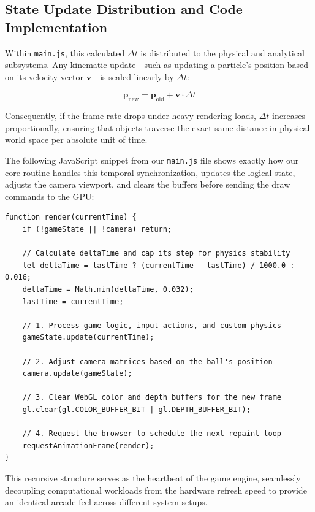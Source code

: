 \subsection{State Update Distribution and Code Implementation}
Within \texttt{main.js}, this calculated $\Delta t$ is distributed to the physical and analytical subsystems. Any kinematic update—such as updating a particle's position based on its velocity vector $\mathbf{v}$—is scaled linearly by $\Delta t$:

\begin{equation}
    \mathbf{p}_{\text{new}} = \mathbf{p}_{\text{old}} + \mathbf{v} \cdot \Delta t
\end{equation}

Consequently, if the frame rate drops under heavy rendering loads, $\Delta t$ increases proportionally, ensuring that objects traverse the exact same distance in physical world space per absolute unit of time. 

The following JavaScript snippet from our \texttt{main.js} file shows exactly how our core routine handles this temporal synchronization, updates the logical state, adjusts the camera viewport, and clears the buffers before sending the draw commands to the GPU:

\begin{lstlisting}[style=vscode_JS]
function render(currentTime) {
    if (!gameState || !camera) return;

    // Calculate deltaTime and cap its step for physics stability
    let deltaTime = lastTime ? (currentTime - lastTime) / 1000.0 : 0.016;
    deltaTime = Math.min(deltaTime, 0.032);
    lastTime = currentTime;

    // 1. Process game logic, input actions, and custom physics
    gameState.update(currentTime);
    
    // 2. Adjust camera matrices based on the ball's position
    camera.update(gameState);
    
    // 3. Clear WebGL color and depth buffers for the new frame
    gl.clear(gl.COLOR_BUFFER_BIT | gl.DEPTH_BUFFER_BIT);

    // 4. Request the browser to schedule the next repaint loop
    requestAnimationFrame(render);
}
\end{lstlisting}

This recursive structure serves as the heartbeat of the game engine, seamlessly decoupling computational workloads from the hardware refresh speed to provide an identical arcade feel across different system setups.